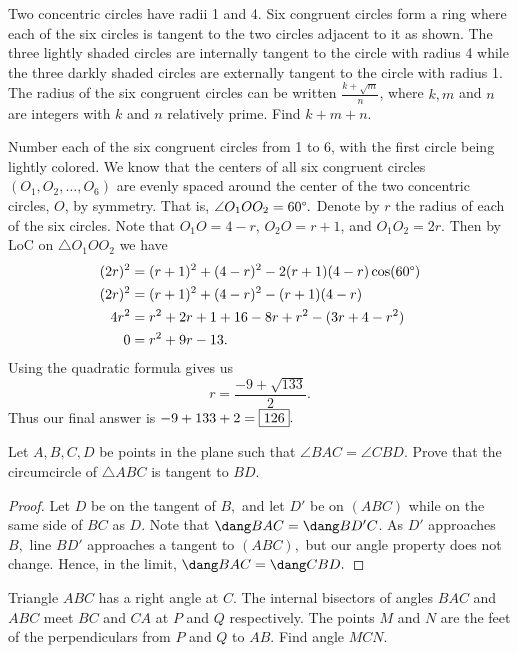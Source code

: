 \documentclass[letterpaper,oneside]{scrartcl}
\begin{document}
\begin{problem*}
  Two concentric circles have radii 1 and 4. Six congruent circles form a ring where each of the six circles is tangent to the two circles adjacent to it as shown. The three lightly shaded circles are internally tangent to the circle with radius 4 while the three darkly shaded circles are externally tangent to the circle with radius 1. The radius of the six congruent circles can be written \(\frac{k+\sqrt{m}}{n}\), where \(k,m\) and \(n\) are integers with \(k\) and \(n\) relatively prime. Find \(k+m+n\).
\end{problem*}
\begin{soln}
  Number each of the six congruent circles from 1 to 6, with the first circle being lightly colored. We know that the centers of all six congruent circles \((O_1,O_2,\dots,O_6)\) are evenly spaced around the center of the two concentric circles, \(O\), by symmetry. That is, \(\angle O_1OO_2 = 60\degree.\) Denote by \(r\) the radius of each of the six circles. Note that \(O_1O=4-r\), \(O_2O = r+1\), and \(O_1O_2 = 2r\). Then by LoC on \(\triangle O_1OO_2\) we have
  \begin{align*}
    (2r)^2 & = (r+1)^2+(4-r)^2-2(r+1)(4-r)\cos(60\degree) \\
    (2r)^2 & = (r+1)^2+(4-r)^2-(r+1)(4-r)                 \\
    4r^2   & = r^2+2r+1+16-8r+r^2-(3r+4-r^2)              \\
    0      & = r^2 +9r-13.
  \end{align*}
  Using the quadratic formula gives us
  \[r=\frac{-9+\sqrt{133}}{2}.\]
  Thus our final answer is \(-9+133+2 = \fbox{126}.\)
\end{soln}
\begin{problem*}
  Let \(A,B,C,D\) be points in the plane such that \(\angle BAC = \angle CBD.\) Prove that the circumcircle of \(\triangle ABC\) is tangent to \(BD\).
\end{problem*}
\begin{proof}
  Let \(D\) be on the tangent of \(B,\) and let \(D'\) be on \((ABC)\) while on the same side of \(BC\) as \(D\). Note that \(\dang BAC = \dang BD'C\). As \(D'\) approaches \(B,\) line \(BD'\) approaches a tangent to \((ABC),\) but our angle property does not change. Hence, in the limit, \(\dang BAC = \dang CBD.\)
\end{proof}
\begin{problem*}
  Triangle \(ABC\) has a right angle at \(C\). The internal bisectors of angles \(BAC\) and \(ABC\) meet \(BC\) and \(CA\) at \(P\) and \(Q\) respectively. The points \(M\) and \(N\) are the feet of the perpendiculars from \(P\) and \(Q\) to \(AB\). Find angle \(MCN\).
\end{problem*}
\end{document}
